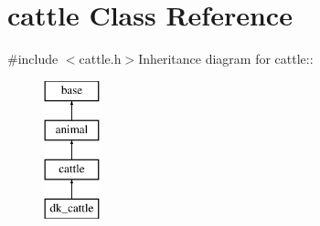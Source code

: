 \hypertarget{classcattle}{
\section{cattle Class Reference}
\label{classcattle}
}


{\ttfamily \#include $<$cattle.h$>$}Inheritance diagram for cattle::\begin{figure}[H]
\begin{center}
\leavevmode
\includegraphics[height=4cm]{classcattle}
\end{center}
\end{figure}
